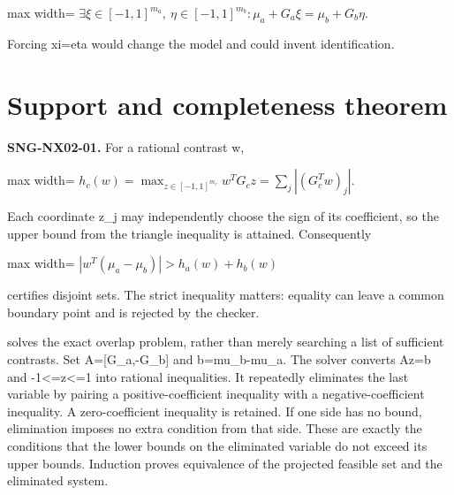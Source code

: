 \documentclass[
  11pt,
  a4paper,
]{report}
\let\singularitytexttt\texttt
\renewcommand{\texttt}[1]{\singularitytexttt{\seqsplit{#1}}}
\begin{document}
\begin{center}
\begin{adjustbox}{max width=\linewidth}
$\displaystyle
\exists\xi\in[-1,1]^{m_a},\ \eta\in[-1,1]^{m_b}:
\mu_a+G_a\xi=\mu_b+G_b\eta.
$
\end{adjustbox}
\end{center}

Forcing xi=eta would change the model and could invent identification.

\hypertarget{support-and-completeness-theorem}{%
\section{Support and completeness
theorem}\label{support-and-completeness-theorem}}

\textbf{SNG-NX02-01.} For a rational contrast w,

\begin{center}
\begin{adjustbox}{max width=\linewidth}
$\displaystyle
h_c(w)=\max_{z\in[-1,1]^{m_c}}w^TG_cz
=\sum_j|(G_c^Tw)_j|.
$
\end{adjustbox}
\end{center}

Each coordinate z\_j may independently choose the sign of its
coefficient, so the upper bound from the triangle inequality is
attained. Consequently

\begin{center}
\begin{adjustbox}{max width=\linewidth}
$\displaystyle
|w^T(\mu_a-\mu_b)|>h_a(w)+h_b(w)
$
\end{adjustbox}
\end{center}

certifies disjoint sets. The strict inequality matters: equality can
leave a common boundary point and is rejected by the checker.

\texttt{joint\_pair\_certificate} solves the exact overlap problem,
rather than merely searching a list of sufficient contrasts. Set
A={[}G\_a,-G\_b{]} and b=mu\_b-mu\_a. The solver converts Az=b and
-1\textless=z\textless=1 into rational inequalities. It repeatedly
eliminates the last variable by pairing a positive-coefficient
inequality with a negative-coefficient inequality. A zero-coefficient
inequality is retained. If one side has no bound, elimination imposes no
extra condition from that side. These are exactly the conditions that
the lower bounds on the eliminated variable do not exceed its upper
bounds. Induction proves equivalence of the projected feasible set and
the eliminated system.
\end{document}
